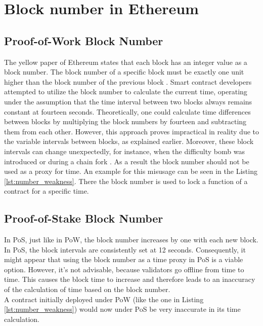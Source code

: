 \section{Block number in Ethereum}
\subsection{Proof-of-Work Block Number}
The yellow paper of Ethereum states that each block has
an integer value as a block number. The block number
of a specific block must be exactly one unit higher than the block
number of the previous block \cite{ethyellowpaper2023}.
Smart contract developers attempted to utilize the block number to calculate
the current time, operating under the assumption that the time interval between
two blocks always remains constant at fourteen seconds. Theoretically, one could
calculate time differences between blocks by multiplying the block numbers by fourteen 
and subtracting them from each other.
However, this approach proves impractical in reality due to the variable
intervals between blocks, as explained earlier. Moreover, these block intervals
can change unexpectedly, for instance, when the difficulty bomb was introduced
or during a chain fork \cite{swc116}.
As a result the block number should not be used as a proxy for time.
An example for this misusage can be seen in the Listing \ref{lst:number_weakness}.
There the block number is used to lock a function of a contract for a specific time.



\subsection{Proof-of-Stake Block Number}
In PoS, just like in PoW, the block number increases by one with each new block.
In PoS, the block intervals are consistently set at 12 seconds.
Consequently, it might appear that using the block number as a time proxy in PoS is a viable option. 
However, it's not advisable, because validators go offline from time to time.
This causes the block time to increase and therefore leads to an inaccuracy of the calculation
of time based on the block number. \\
A contract initially deployed under PoW (like the one in Listing \ref{lst:number_weakness}) would now under PoS
be very inaccurate in its time calculation.


